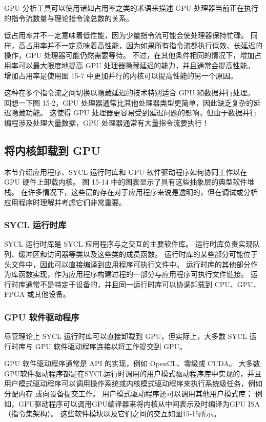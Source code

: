 GPU 分析工具可以使用诸如占用率之类的术语来描述 GPU 处理器当前正在执行的指令流数量与理论指令流总数的关系。

低占用率并不一定意味着低性能，因为少量指令流可能会使处理器保持忙碌。 同样，高占用率并不一定意味着高性能，因为如果所有指令流都执行低效、长延迟的操作，GPU 处理器可能仍然需要等待。 不过，在其他条件相同的情况下，增加占用率可以最大限度地提高 GPU 处理器隐藏延迟的能力，并且通常会提高性能。 增加占用率是使用图 15-7 中更加并行的内核可以提高性能的另一个原因。

这种在多个指令流之间切换以隐藏延迟的技术特别适合 GPU 和数据并行处理。 回想一下图 15-2，GPU 处理器通常比其他处理器类型更简单，因此缺乏复杂的延迟隐藏功能。 这使得 GPU 处理器更容易受到延迟问题的影响，但由于数据并行编程涉及处理大量数据，GPU 处理器通常有大量指令流要执行！

\subsection{将内核卸载到 GPU}
本节介绍应用程序、SYCL 运行时库和 GPU 软件驱动程序如何协同工作以在 GPU 硬件上卸载内核。 图 15-14 中的图表显示了具有这些抽象层的典型软件堆栈。 在许多情况下，这些层的存在对于应用程序来说是透明的，但在调试或分析应用程序时理解并考虑它们非常重要。

\subsubsection{SYCL 运行时库}
SYCL 运行时库是 SYCL 应用程序与之交互的主要软件库。 运行时库负责实现队列、缓冲区和访问器等类以及这些类的成员函数。 运行时库的某些部分可能位于头文件中，因此可以直接编译到应用程序可执行文件中。 运行时库的其他部分作为库函数实现，作为应用程序构建过程的一部分与应用程序可执行文件链接。 运行时库通常不是特定于设备的，并且同一运行时库可以协调卸载到 CPU、GPU、FPGA 或其他设备。

\subsubsection{GPU 软件驱动程序}
尽管理论上 SYCL 运行时库可以直接卸载到 GPU，但实际上，大多数 SYCL 运行时库与 GPU 软件驱动程序连接以将工作提交到 GPU。

GPU 软件驱动程序通常是 API 的实现，例如 OpenCL、零级或 CUDA。 大多数GPU软件驱动程序都是在SYCL运行时调用的用户模式驱动程序库中实现的，并且用户模式驱动程序可以调用操作系统或内核模式驱动程序来执行系统级任务，例如分配内存 或向设备提交工作。 用户模式驱动程序还可以调用其他用户模式库； 例如，GPU驱动程序可以调用GPU编译器来将内核从中间表示及时编译为GPU ISA（指令集架构）。 这些软件模块以及它们之间的交互如图15-15所示。

